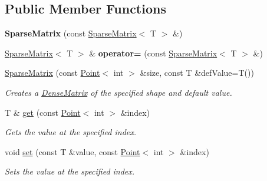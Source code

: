 \subsection*{Public Member Functions}
\begin{DoxyCompactItemize}
\item 
\hypertarget{classrepast_1_1_sparse_matrix_adb475ba96b25d4b5dbddd0de9f87d7fa}{{\bfseries Sparse\-Matrix} (const \hyperlink{classrepast_1_1_sparse_matrix}{Sparse\-Matrix}$<$ T $>$ \&)}\label{classrepast_1_1_sparse_matrix_adb475ba96b25d4b5dbddd0de9f87d7fa}

\item 
\hypertarget{classrepast_1_1_sparse_matrix_ab17bd119812f2fe1760841b753b669af}{\hyperlink{classrepast_1_1_sparse_matrix}{Sparse\-Matrix}$<$ T $>$ \& {\bfseries operator=} (const \hyperlink{classrepast_1_1_sparse_matrix}{Sparse\-Matrix}$<$ T $>$ \&)}\label{classrepast_1_1_sparse_matrix_ab17bd119812f2fe1760841b753b669af}

\item 
\hypertarget{classrepast_1_1_sparse_matrix_a83960f62be1cf81f1c3de79e680a3970}{\hyperlink{classrepast_1_1_sparse_matrix_a83960f62be1cf81f1c3de79e680a3970}{Sparse\-Matrix} (const \hyperlink{classrepast_1_1_point}{Point}$<$ int $>$ \&size, const T \&def\-Value=T())}\label{classrepast_1_1_sparse_matrix_a83960f62be1cf81f1c3de79e680a3970}

\begin{DoxyCompactList}\small\item\em Creates a \hyperlink{classrepast_1_1_dense_matrix}{Dense\-Matrix} of the specified shape and default value. \end{DoxyCompactList}\item 
\hypertarget{classrepast_1_1_sparse_matrix_a846c4d5236c2b39b62a08242bf6fc2aa}{T \& \hyperlink{classrepast_1_1_sparse_matrix_a846c4d5236c2b39b62a08242bf6fc2aa}{get} (const \hyperlink{classrepast_1_1_point}{Point}$<$ int $>$ \&index)}\label{classrepast_1_1_sparse_matrix_a846c4d5236c2b39b62a08242bf6fc2aa}

\begin{DoxyCompactList}\small\item\em Gets the value at the specified index. \end{DoxyCompactList}\item 
\hypertarget{classrepast_1_1_sparse_matrix_a582af41a93780713e56e6a97244f1ad2}{void \hyperlink{classrepast_1_1_sparse_matrix_a582af41a93780713e56e6a97244f1ad2}{set} (const T \&value, const \hyperlink{classrepast_1_1_point}{Point}$<$ int $>$ \&index)}\label{classrepast_1_1_sparse_matrix_a582af41a93780713e56e6a97244f1ad2}

\begin{DoxyCompactList}\small\item\em Sets the value at the specified index. \end{DoxyCompactList}\end{DoxyCompactItemize}
